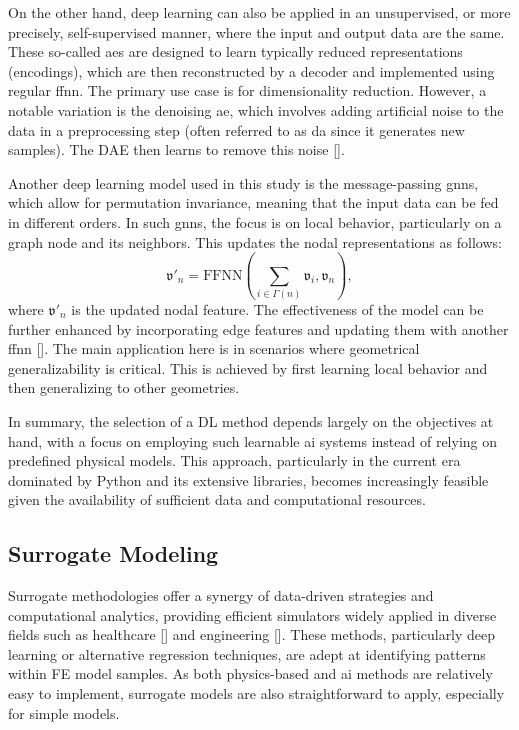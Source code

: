On the other hand, deep learning can also be applied in an unsupervised, or more precisely, self-supervised manner, where the input and output data are the same. These so-called \acp{ae} are designed to learn typically reduced representations (encodings), which are then reconstructed by a decoder and implemented using regular \ac{ffnn}. The primary use case is for dimensionality reduction. However, a notable variation is the denoising \ac{ae}, which involves adding artificial noise to the data in a preprocessing step (often referred to as \ac{da} since it generates new samples). The DAE then learns to remove this noise [\cite{hinton2006,vincent2008}].

Another deep learning model used in this study is the message-passing \acp{gnn}, which allow for permutation invariance, meaning that the input data can be fed in different orders. In such \acp{gnn}, the focus is on local behavior, particularly on a graph node and its neighbors. This updates the nodal representations as follows:
%
\begin{equation}
\label{eq:gnn}
\mathfrak{v}'_n = \text{FFNN} \left(\sum_{i \in \Gamma(n)}\mathfrak{v}_i, \mathfrak{v}_n\right),
\end{equation}
%
where $\mathfrak{v}'_n$ is the updated nodal feature. The effectiveness of the model can be further enhanced by incorporating edge features and updating them with another \ac{ffnn} [\cite{cai2018,zhou2020,wu2021}]. The main application here is in scenarios where geometrical generalizability is critical. This is achieved by first learning local behavior and then generalizing to other geometries.

In summary, the selection of a DL method depends largely on the objectives at hand, with a focus on employing such learnable \ac{ai} systems instead of relying on predefined physical models. This approach, particularly in the current era dominated by Python and its extensive libraries, becomes increasingly feasible given the availability of sufficient data and computational resources.

\subsection{Surrogate Modeling}
%
Surrogate methodologies offer a synergy of data-driven strategies and computational analytics, providing efficient simulators widely applied in diverse fields such as healthcare [\cite{holzapfel2021,shim2020,liang2018b}] and engineering [\cite{pfaff2021,gao2020b,kalyuzhnyuk2019}]. These methods, particularly deep learning or alternative regression techniques, are adept at identifying patterns within FE model samples. As both physics-based and \ac{ai} methods are relatively easy to implement, surrogate models are also straightforward to apply, especially for simple models.

